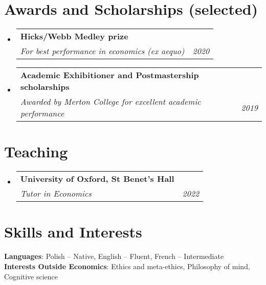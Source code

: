 \documentclass[letterpaper,11pt]{article}
\makeatletter
\newcommand{\resumeSubheading}[3]{
  \vspace{-2pt}\item
    \begin{tabular*}{0.97\textwidth}[t]{l@{\extracolsep{\fill}}r}
      \textbf{#1} \\
      \textit{\small#2} & \textit{\small #3} \\
    \end{tabular*}\vspace{-7pt}
}
\newcommand{\resumeSubHeadingListStart}{\begin{itemize}[leftmargin=0.15in, label={}]}
\newcommand{\resumeSubHeadingListEnd}{\end{itemize}}
\makeatother
\begin{document}
\bigskip



\section{Awards and Scholarships (selected)}
  \resumeSubHeadingListStart
     \resumeSubheading
      {Hicks/Webb Medley prize}
      {For best performance in economics (ex aequo)}{2020}
\newline
     \resumeSubheading
      {Academic Exhibitioner and Postmastership scholarships}
      {Awarded by Merton College for excellent academic performance}{2019}
  \resumeSubHeadingListEnd

\bigskip




\section{Teaching}
  \resumeSubHeadingListStart
     \resumeSubheading
      {University of Oxford, St Benet’s Hall}
      {Tutor in Economics}{2022}
  \resumeSubHeadingListEnd

\bigskip




\section{Skills and Interests}
 \begin{itemize}[leftmargin=0.15in, label={}]
    \small{\item{
     \textbf{Languages}{: Polish -- Native, English -- Fluent, French -- Intermediate} \\
     \textbf{Interests Outside Economics}{: Ethics and meta-ethics, Philosophy of mind, Cognitive science} \\
    }}
    
 \end{itemize}
 
    
\end{document}
